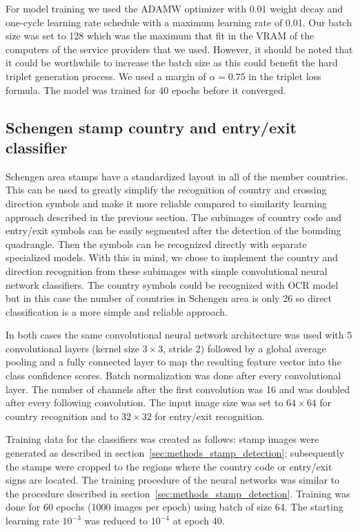 \documentclass[twocolumn]{svjour3}
\begin{document}
For model training we used the ADAMW optimizer with 0.01 weight decay and one-cycle learning rate schedule \cite{smith_disciplined_2018}
with a maximum learning rate of 0.01. Our batch size was set to 128 which was the maximum that fit in the VRAM of the computers of the service providers that we used. However, it should be noted that it could be worthwhile to increase the batch size as this could benefit the hard triplet generation process. We used a margin of $\alpha=0.75$ in the triplet loss formula. The model was trained for 40 epochs before it converged.

\subsection{Schengen stamp country and entry/exit classifier}
\label{sec:methods_country_entry_exit}

Schengen area stamps have a standardized layout in all of the member countries. This can be used to greatly simplify the recognition of country and crossing direction symbols and make it more reliable compared to similarity learning approach described in the previous section. The subimages of country code and entry/exit symbols can be easily segmented after the detection of the bounding quadrangle. Then the symbols can be recognized directly with separate specialized models. With this in mind, we chose to implement the country and direction recognition from these subimages with simple convolutional neural network classifiers. The country symbols could be recognized with OCR model but in this case the number of countries in Schengen area is only 26 so direct classification is a more simple and reliable approach.

In both cases the same convolutional neural network architecture was used with 5 convolutional layers (kernel size $3 \times 3$, stride 2) followed by a global average pooling and a fully connected layer to map the resulting feature vector into the class confidence scores. Batch normalization was done after every convolutional layer. The number of channels after the first convolution was 16 and was doubled after every following convolution. The input image size was set to $64 \times 64$ for country recognition and to $32 \times 32$ for entry/exit recognition.

Training data for the classifiers was created as follows: stamp images were generated as described in section~\ref{sec:methods_stamp_detection}; subsequently the stamps were cropped to the regions where the country code or entry/exit signs are located. The training procedure of the neural networks was similar to the procedure described in section~\ref{sec:methods_stamp_detection}. Training was done for 60 epochs (1000 images per epoch) using batch of size 64. The starting learning rate $10^{-3}$ was reduced to $10^{-4}$ at epoch 40.
\end{document}
